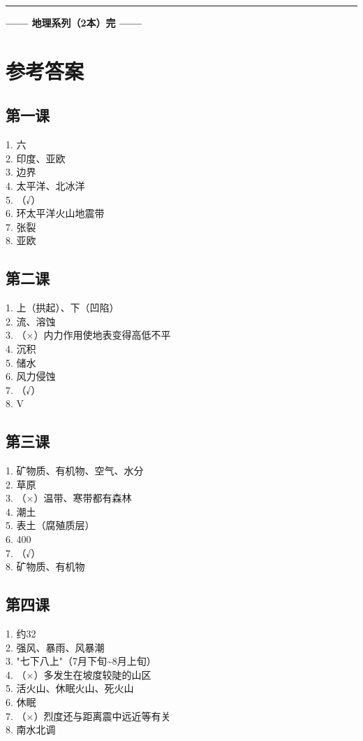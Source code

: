 \documentclass[a4paper,12pt]{ctexart}
\begin{document}
\vspace{0.5cm}
\begin{center}\rule{0.7\textwidth}{1pt}\vspace{0.4cm}
{\large\textcolor{blue!70!black}{\textbf{—— 地理系列（2本）完 ——}}}
\end{center}

\newpage
\section*{\textcolor{defblue}{参考答案}}

\subsection*{第一课}
1. 六\\
2. 印度、亚欧\\
3. 边界\\
4. 太平洋、北冰洋\\
5. （√）\\
6. 环太平洋火山地震带\\
7. 张裂\\
8. 亚欧

\subsection*{第二课}
1. 上（拱起）、下（凹陷）\\
2. 流、溶蚀\\
3. （×）内力作用使地表变得高低不平\\
4. 沉积\\
5. 储水\\
6. 风力侵蚀\\
7. （√）\\
8. V

\subsection*{第三课}
1. 矿物质、有机物、空气、水分\\
2. 草原\\
3. （×）温带、寒带都有森林\\
4. 潮土\\
5. 表土（腐殖质层）\\
6. 400\\
7. （√）\\
8. 矿物质、有机物

\subsection*{第四课}
1. 约32\\
2. 强风、暴雨、风暴潮\\
3. "七下八上"（7月下旬\~{}8月上旬）\\
4. （×）多发生在坡度较陡的山区\\
5. 活火山、休眠火山、死火山\\
6. 休眠\\
7. （×）烈度还与距离震中远近等有关\\
8. 南水北调
\end{document}
